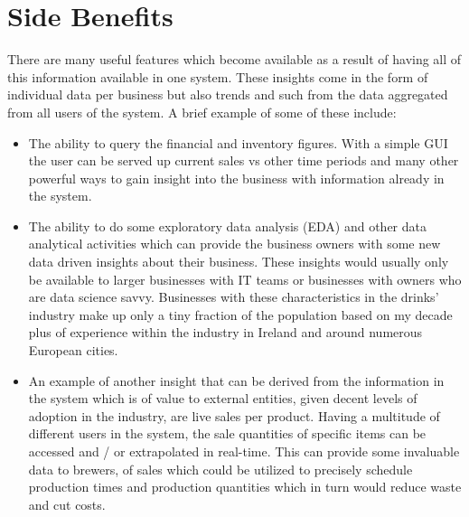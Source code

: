 \section{Side Benefits}
\label{subsec:side_benefits}
There are many useful features which become available as a result of having all of this information available in one system. These insights come in the form of individual data per
business but also trends and such from the data aggregated from all users of the system. A brief example of some of these include:
\begin{itemize}
	\item The ability to query the financial and inventory figures. With a simple GUI the user can be served up current sales vs other time periods and many other powerful ways to gain insight into
	      the business with information already in the system.
	\item The ability to do some exploratory data analysis (EDA) and other data analytical activities which can provide the business owners with some new data driven insights about their business.
	      These insights would usually only be available to larger businesses with IT teams or businesses with owners who are data science savvy. Businesses with these characteristics in the
	      drinks' industry make up only a tiny fraction of the population based on my decade plus of experience within the industry in Ireland and around numerous European cities.
	\item An example of another insight that can be derived from the information in the system which is of value to external entities, given decent levels of adoption in the industry,
	      are live sales per product.
	      Having a multitude of different users in the system, the sale quantities of specific items can be accessed and / or extrapolated in real-time. This can provide some invaluable
	      data to brewers, of sales which could be utilized to precisely schedule production times and production quantities which in turn would reduce waste 
		  and cut costs.
\end{itemize}
\newpage
